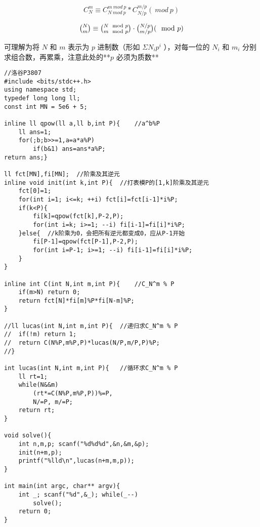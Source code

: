 
$$C_N^m \equiv C_{N\ mod\ p}^{m\ mod\ p} * C_{N/p}^{m/p}(\ mod\ p)$$

$$\tbinom N m \equiv \tbinom{N\mod p}{m\mod p} \cdot \tbinom{N/p}{m/p}(\mod p)$$

可理解为将 $N$ 和 $m$ 表示为 $p$ 进制数（形如 $\Sigma N_ip^i$ ），对每一位的 $N_i$ 和 $m_i$ 分别求组合数，再累乘，注意此处的**$p$ 必须为质数**

\begin{lstlisting}
//洛谷P3807 
#include <bits/stdc++.h>
using namespace std;
typedef long long ll;
const int MN = 5e6 + 5;

inline ll qpow(ll a,ll b,int P){	//a^b%P 
	ll ans=1;
	for(;b;b>>=1,a=a*a%P)
		if(b&1) ans=ans*a%P;
return ans;}

ll fct[MN],fi[MN];	//阶乘及其逆元
inline void init(int k,int P){	//打表模P的[1,k]阶乘及其逆元
	fct[0]=1;
	for(int i=1; i<=k; ++i) fct[i]=fct[i-1]*i%P;
	if(k<P){
		fi[k]=qpow(fct[k],P-2,P);
		for(int i=k; i>=1; --i) fi[i-1]=fi[i]*i%P;
	}else{	//k阶乘为0，会把所有逆元都变成0，应从P-1开始
		fi[P-1]=qpow(fct[P-1],P-2,P);
		for(int i=P-1; i>=1; --i) fi[i-1]=fi[i]*i%P;
	}
}

inline int C(int N,int m,int P){	//C_N^m % P
	if(m>N) return 0;
	return fct[N]*fi[m]%P*fi[N-m]%P;
}

//ll lucas(int N,int m,int P){	//递归求C_N^m % P
//	if(!m) return 1;
//	return C(N%P,m%P,P)*lucas(N/P,m/P,P)%P;
//}

int lucas(int N,int m,int P){	//循环求C_N^m % P
	ll rt=1;
	while(N&&m)
		(rt*=C(N%P,m%P,P))%=P,
		N/=P, m/=P;
	return rt;
}

void solve(){
	int n,m,p; scanf("%d%d%d",&n,&m,&p);
	init(n+m,p);
	printf("%lld\n",lucas(n+m,m,p));
}

int main(int argc, char** argv){ 
	int _; scanf("%d",&_); while(_--)
		solve();
	return 0;
}
\end{lstlisting}